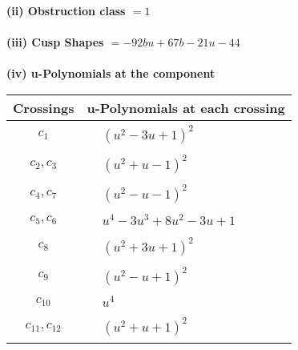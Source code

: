 \documentclass[1p]{elsarticle_modified}
\theoremstyle{definition}
\begin{document}
\flushleft \textbf{(ii) Obstruction class $= 1$}\\~\\
\flushleft \textbf{(iii) Cusp Shapes $= -92 b u+67 b-21 u-44$}\\~\\
\newpage\renewcommand{\arraystretch}{1}
\flushleft \textbf{(iv) u-Polynomials at the component}\newline \\
\begin{tabular}{m{50pt}|m{274pt}}
Crossings & \hspace{64pt}u-Polynomials at each crossing \\
\hline $$\begin{aligned}c_{1}\end{aligned}$$&$\begin{aligned}
&(u^2-3 u+1)^2
\end{aligned}$\\
\hline $$\begin{aligned}c_{2},c_{3}\end{aligned}$$&$\begin{aligned}
&(u^2+u-1)^2
\end{aligned}$\\
\hline $$\begin{aligned}c_{4},c_{7}\end{aligned}$$&$\begin{aligned}
&(u^2- u-1)^2
\end{aligned}$\\
\hline $$\begin{aligned}c_{5},c_{6}\end{aligned}$$&$\begin{aligned}
&u^4-3 u^3+8 u^2-3 u+1
\end{aligned}$\\
\hline $$\begin{aligned}c_{8}\end{aligned}$$&$\begin{aligned}
&(u^2+3 u+1)^2
\end{aligned}$\\
\hline $$\begin{aligned}c_{9}\end{aligned}$$&$\begin{aligned}
&(u^2- u+1)^2
\end{aligned}$\\
\hline $$\begin{aligned}c_{10}\end{aligned}$$&$\begin{aligned}
&u^4
\end{aligned}$\\
\hline $$\begin{aligned}c_{11},c_{12}\end{aligned}$$&$\begin{aligned}
&(u^2+u+1)^2
\end{aligned}$\\
\hline
\end{tabular}\\~\\
\end{document}
